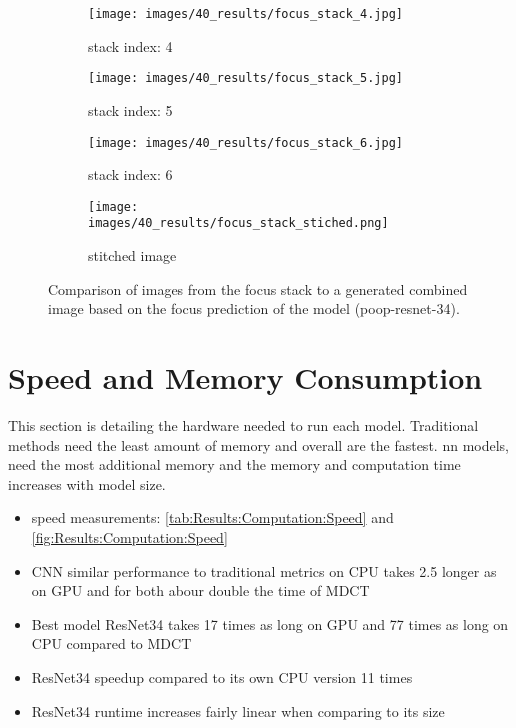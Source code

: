 \begin{figure}
    \centering
    \begin{subfigure}[b]{\textwidth}
        \centering
        \caption{stack index: 4}
        \texttt{[image: images/40\_results/focus\_stack\_4.jpg]}
        \label{fig:Results:Stack:SideBySide:Index0}
    \end{subfigure}
    \begin{subfigure}[b]{\textwidth}
        \centering
        \caption{stack index: 5}
        \texttt{[image: images/40\_results/focus\_stack\_5.jpg]}
        \label{fig:Results:Stack:SideBySide:Index1}
    \end{subfigure}
    \begin{subfigure}[b]{\textwidth}
        \centering
        \caption{stack index: 6}
        \texttt{[image: images/40\_results/focus\_stack\_6.jpg]}
        \label{fig:Results:Stack:SideBySide:Index2}
    \end{subfigure}
    \begin{subfigure}[b]{\textwidth}
        \centering
        \caption{stitched image}
        \texttt{[image: images/40\_results/focus\_stack\_stiched.png]}
        \label{fig:Results:Stack:SideBySide:Stiched}
    \end{subfigure}
    \caption{Comparison of images from the focus stack to a generated combined image based on the focus prediction of the model (\acs{poop}-\acs{resnet}-34).}
    \label{fig:Results:Stack:SideBySide}
\end{figure}

\section{Speed and Memory Consumption}
\label{sec:Results:Computation}

This section is detailing the hardware needed to run each model. Traditional methods need the least amount of memory and overall are the fastest. \Acl{nn} models, need the most additional memory and the memory and computation time increases with model size. 

\begin{itemize}
    \item speed measurements: \autoref{tab:Results:Computation:Speed} and \autoref{fig:Results:Computation:Speed}
    \item CNN similar performance to traditional metrics on CPU takes 2.5 longer as on GPU and for both abour double the time of MDCT
    \item Best model ResNet34 takes 17 times as long on GPU and 77 times as long on CPU compared to MDCT
    \item ResNet34 speedup compared to its own CPU version 11 times 
    \item ResNet34 runtime increases fairly linear when comparing to its size 
\end{itemize}


